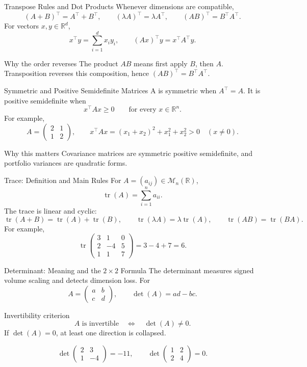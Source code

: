 \documentclass[aspectratio=169]{beamer}
\newcommand{\R}{\mathbb{R}}
\newcommand{\M}{\mathcal{M}}
\newcommand{\tr}{\operatorname{tr}}
\begin{document}
\begin{frame}{Transpose Rules and Dot Products}
Whenever dimensions are compatible,
\[
(A+B)^\top=A^\top+B^\top,
\qquad
(\lambda A)^\top=\lambda A^\top,
\qquad
(AB)^\top=B^\top A^\top.
\]
\pause
For vectors $x,y\in\R^d$,
\[
x^\top y=\sum_{i=1}^d x_i y_i,
\qquad
(Ax)^\top y=x^\top A^\top y.
\]
\begin{block}{Why the order reverses}
The product $AB$ means first apply $B$, then $A$. Transposition reverses this
composition, hence $(AB)^\top=B^\top A^\top$.
\end{block}
\end{frame}

\begin{frame}{Symmetric and Positive Semidefinite Matrices}
A is symmetric when $A^\top=A$. It is positive semidefinite when
\[
x^\top Ax\ge0\qquad\text{for every }x\in\R^n.
\]
\pause
For example,
\[
A=\begin{pmatrix}2&1\\1&2\end{pmatrix},
\qquad
x^\top Ax=(x_1+x_2)^2+x_1^2+x_2^2>0
\quad(x\neq0).
\]
\begin{block}{Why this matters}
Covariance matrices are symmetric positive semidefinite, and portfolio
variances are quadratic forms.
\end{block}
\end{frame}

\begin{frame}{Trace: Definition and Main Rules}
For $A=(a_{ij})\in\M_n(\R)$,
\[
\tr(A)=\sum_{i=1}^n a_{ii}.
\]
\pause
The trace is linear and cyclic:
\[
\tr(A+B)=\tr(A)+\tr(B),
\qquad
\tr(\lambda A)=\lambda\tr(A),
\qquad
\tr(AB)=\tr(BA).
\]
\pause
For example,
\[
\tr\begin{pmatrix}3&1&0\\2&-4&5\\1&1&7\end{pmatrix}=3-4+7=6.
\]
\end{frame}

\begin{frame}{Determinant: Meaning and the $2\times2$ Formula}
The determinant measures signed volume scaling and detects dimension loss.
For
\[
A=\begin{pmatrix}a&b\\c&d\end{pmatrix},
\qquad
\det(A)=ad-bc.
\]
\pause
\begin{block}{Invertibility criterion}
\[
A\text{ is invertible}\quad\Longleftrightarrow\quad\det(A)\neq0.
\]
If $\det(A)=0$, at least one direction is collapsed.
\end{block}
\pause
\[
\det\begin{pmatrix}2&3\\1&-4\end{pmatrix}=-11,
\qquad
\det\begin{pmatrix}1&2\\2&4\end{pmatrix}=0.
\]
\end{frame}
\end{document}
